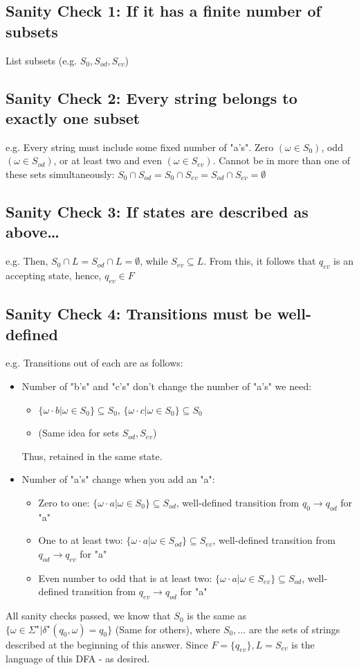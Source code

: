 \documentclass{article}
\begin{document}
\subsection*{Sanity Check 1: If it has a finite number of subsets}
List subsets (e.g. $S_0, S_{od},S_{ev}$)
\subsection*{Sanity Check 2: Every string belongs to \textbf{exactly one} subset}
e.g. Every string must include some fixed number of "a's". Zero $(\omega\in S_0)$, odd $(\omega\in S_{od})$, or at least two and even $(\omega\in S_{ev})$.
Cannot be in more than one of these sets simultaneously: $S_0\cap S_{od}=S_0\cap S_{ev}=S_{od}\cap S_{ev}=\emptyset$
\subsection*{Sanity Check 3: If states are described as above\dots}
e.g. Then, $S_0\cap L=S_{od}\cap L=\emptyset$, while $S_{ev}\subseteq L$. From this, it follows that $q_{ev}$ is an accepting state, 
hence, $q_{ev}\in F$
\subsection*{Sanity Check 4: Transitions must be well-defined}
e.g. Transitions out of each are as follows:
\begin{itemize}
    \item Number of "b's" and "c's" don't change the number of "a's" we need:
    \begin{itemize}
        \item $\{\omega\cdot b|\omega\in S_0\}\subseteq S_0$, $\{\omega\cdot c|\omega\in S_0\}\subseteq S_0$
        \item (Same idea for sets $S_{od},S_{ev}$)
    \end{itemize}
    Thus, retained in the same state.
    \item Number of "a's" change when you add an "a":
    \begin{itemize}
        \item Zero to one: $\{\omega\cdot a|\omega\in S_0\}\subseteq S_{od}$, well-defined transition from $q_0\rightarrow q_{od}$ for "a"
        \item One to at least two: $\{\omega\cdot a|\omega\in S_{od}\}\subseteq S_{ev}$, well-defined transition from $q_{od}\rightarrow q_{ev}$ for "a"
        \item Even number to odd that is at least two: $\{\omega\cdot a|\omega\in S_{ev}\}\subseteq S_{od}$, well-defined transition from $q_{ev}\rightarrow q_{od}$ for "a"
    \end{itemize}
\end{itemize}
All sanity checks passed, we know that $S_0$ is the same as $\{\omega\in\Sigma^\star|\delta^\star(q_0,\omega)=q_0\}$ (Same for others), where $S_0,\dots$ are
the sets of strings described at the beginning of this answer. Since $F=\{q_{ev}\}, L=S_{ev}$ is the language of this DFA - as desired.
\end{document}
